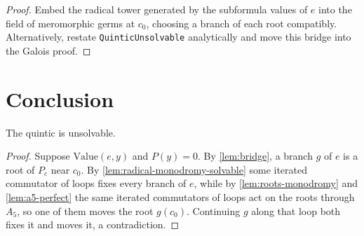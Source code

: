 \begin{proof}
  Embed the radical tower generated by the subformula values of $e$ into the field of
  meromorphic germs at $c_0$, choosing a branch of each root compatibly.
  Alternatively, restate \texttt{QuinticUnsolvable} analytically and move this bridge into the
  Galois proof.
\end{proof}

\section{Conclusion}

\begin{theorem}
  \label{thm:arnold-main}
  The quintic is unsolvable.
\end{theorem}

\begin{proof}
  Suppose $\mathrm{Value}(e, y)$ and $P(y) = 0$. By \cref{lem:bridge}, a branch $g$ of $e$ is a
  root of $P_c$ near $c_0$. By \cref{lem:radical-monodromy-solvable} some iterated commutator of
  loops fixes every branch of $e$, while by \cref{lem:roots-monodromy} and \cref{lem:a5-perfect}
  the same iterated commutators of loops act on the roots through $A_5$, so one of them moves
  the root $g(c_0)$. Continuing $g$ along that loop both fixes it and moves it, a contradiction.
\end{proof}
